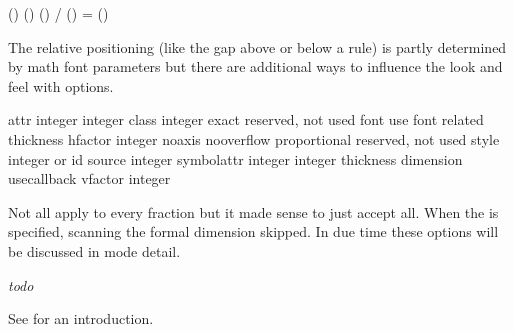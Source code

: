 \starttabulate[|l|lT|lT|lT|lT|l|]
    \NC \type{\Uabovewithdelims}     \NC   \NC () \NC 1pt \NC {} \NC {} \NC \NR \TB[medium]
    \NC \type{\Uatopwithdelims}      \NC   \NC () \NC     \NC {} \NC {} \NC \NR \TB[medium]
    \NC \type{\Uoverwithdelims}      \NC   \NC () \NC     \NC {} \NC {} \NC \NR \TB[medium]
    \NC \type{\Uskewedwithdelims}    \NC / \NC () \NC     \NC {} \NC {} \NC \NR \TB[medium]
    \NC \type{\Ustretchedwithdelims} \NC = \NC () \NC     \NC {} \NC {} \NC \NR
\stoptabulate

The relative positioning (like the gap above or below a rule) is partly
determined by math font parameters but there are additional ways to influence the
look and feel with options.

\starttabulate[|Tl|l|l|]
\NC attr         \NC integer integer \NC \NC \NR
\NC class        \NC integer         \NC \NC \NR
\NC exact        \NC                 \NC reserved, not used \NC \NR
\NC font         \NC                 \NC use font related thickness \NC \NR
\NC hfactor      \NC integer         \NC \NC \NR
\NC noaxis       \NC                 \NC \NC \NR
\NC nooverflow   \NC                 \NC \NC \NR
\NC proportional \NC                 \NC reserved, not used \NC \NR
\NC style        \NC integer or id   \NC \NC \NR
\NC source       \NC integer         \NC \NC \NR
\NC symbolattr   \NC integer integer \NC \NC \NR
\NC thickness    \NC dimension       \NC \NC \NR
\NC usecallback  \NC                 \NC \NC \NR
\NC vfactor      \NC integer         \NC \NC \NR
\stoptabulate

Not all apply to every fraction but it made sense to just accept all. When the
 is specified, scanning the formal dimension skipped. In due
time these options will be discussed in mode detail.

\stopnewprimitive

\startnewprimitive[title={\prm {Uoverdelimiter}}]

{\em todo} 

\stopnewprimitive

\startnewprimitive[title={\prm {Uoverwithdelims}}]

See  for an introduction.

